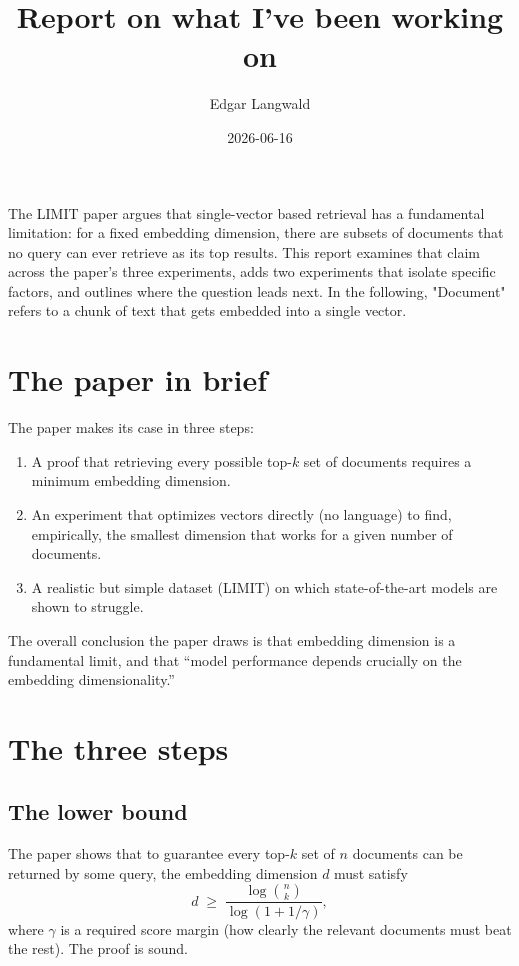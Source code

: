 \documentclass[11pt]{article}
\title{\vspace{-1.5em}Report on what I've been working on}
\author{Edgar Langwald}
\date{2026-06-16}
\begin{document}
\maketitle
\vspace{-1em}

The LIMIT paper argues that single-vector based retrieval has a fundamental limitation: for a fixed embedding dimension, there are subsets of documents that no query can ever retrieve as its top results. This report examines that claim across the paper's three experiments, adds two experiments that isolate specific factors, and outlines where the question leads next.
In the following, "Document" refers to a chunk of text that gets embedded into a single vector.

\section{The paper in brief}

The paper makes its case in three steps:

\begin{enumerate}
  \item A proof that retrieving every possible top-$k$ set of documents requires a minimum embedding dimension.
  \item An experiment that optimizes vectors directly (no language) to find, empirically, the smallest dimension that works for a given number of documents.
  \item A realistic but simple dataset (LIMIT) on which state-of-the-art models are shown to struggle.
\end{enumerate}

The overall conclusion the paper draws is that embedding dimension is a fundamental limit, and that ``model performance depends crucially on the embedding dimensionality.''

\section{The three steps}

\subsection{The lower bound}

The paper shows that to guarantee every top-$k$ set of $n$ documents can be returned by some query, the embedding dimension $d$ must satisfy
\[
d \;\ge\; \frac{\log\binom{n}{k}}{\log(1+1/\gamma)},
\]
where $\gamma$ is a required score margin (how clearly the relevant documents must beat the rest). The proof is sound.
\end{document}
